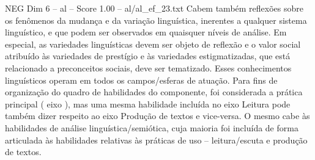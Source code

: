 \begin{textsample}{NEG Dim 6 – al – Score 1.00 – al/al\_ef\_23.txt}
Cabem também reflexões sobre os fenômenos da mudança e da variação linguística, inerentes a qualquer sistema linguístico, e que podem ser observados em quaisquer níveis de análise.
Em especial, as variedades linguísticas devem ser objeto de reflexão e o valor social atribuído às variedades de prestígio e às variedades estigmatizadas, que está relacionado a preconceitos sociais, deve ser tematizado.
Esses conhecimentos linguísticos operam em todos os campos/esferas de atuação.
Para fins de organização do quadro de habilidades do componente, foi considerada a prática principal ( eixo ), mas uma mesma habilidade incluída no eixo Leitura pode também dizer respeito ao eixo Produção de textos e vice-versa.
O mesmo cabe às habilidades de análise linguística/semiótica, cuja maioria foi incluída de forma articulada às habilidades relativas às práticas de uso – leitura/escuta e produção de textos.

\end{textsample}

